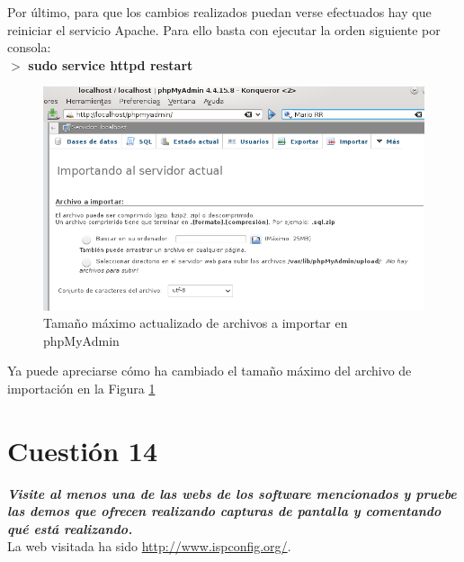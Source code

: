 Por último, para que los cambios realizados puedan verse efectuados hay que reiniciar el servicio Apache.
Para ello basta con ejecutar la orden siguiente por consola:
\\

$ > $ \textbf{sudo service httpd restart}

\begin{figure}[H] %
	\centering
	\includegraphics[scale=0.7]{figuras/figura56.png} 
	\caption{Tamaño máximo actualizado de archivos a importar en phpMyAdmin} 
	\label{fig:figura56}
\end{figure}

Ya puede apreciarse cómo ha cambiado el tamaño máximo del archivo de importación en la Figura \ref{fig:figura56}

\newpage

\section{Cuestión 14}
\textbf{\textit{Visite al menos una de las webs de los software mencionados
y pruebe las demos que ofrecen realizando capturas de pantalla y
comentando qué está realizando.}}
\\

La web visitada ha sido \url{http://www.ispconfig.org/}.

